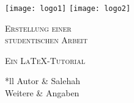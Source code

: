 \thispagestyle{empty}	


\texttt{[image: logo1]}
\hfill
\texttt{[image: logo2]}


\begin{center}
	\vfill

	\begin{Huge}
		\textsc{Erstellung einer\\studentischen Arbeit}
	\end{Huge}
	
	\vspace{1cm}

	\begin{Large}
		\textsc{Ein \LaTeX{}-Tutorial}
	\end{Large}
	
	\vspace{9cm}
	
	\begin{tabu} to \textwidth{*ll}
		Autor	& Salehah\\
		Weitere	& Angaben
	\end{tabu}	
	
	\vfill	
	
\end{center}

